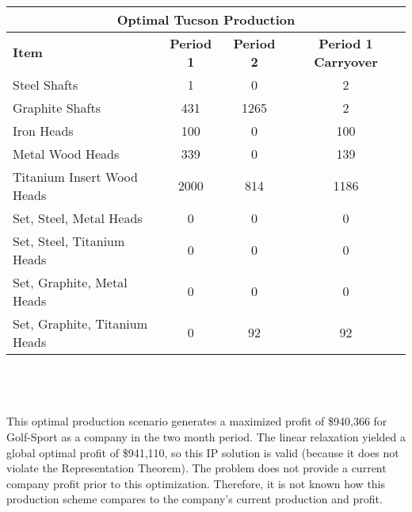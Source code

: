 \documentclass{article}
\begin{document}
\vspace{5mm}
\\
\noindent
\begin{tabular}{ l | c | c | c }
\hline
\multicolumn{4}{|c|}{Optimal Tucson Production} \\
\hline
\textbf{Item} & \textbf{Period 1} & \textbf{Period 2} & \textbf{Period 1 Carryover} \\
Steel Shafts & 1 & 0 & 2 \\
Graphite Shafts & 431 & 1265 & 2 \\
Iron Heads & 100 & 0 & 100 \\
Metal Wood Heads & 339 & 0 & 139 \\
Titanium Insert Wood Heads & 2000 & 814 & 1186 \\
Set, Steel, Metal Heads & 0 & 0 & 0 \\
Set, Steel, Titanium Heads & 0 & 0 & 0 \\
Set, Graphite, Metal Heads & 0 & 0 & 0 \\
Set, Graphite, Titanium Heads & 0 & 92 & 92\\
\end{tabular}
\\
\\
\vspace{5mm}
\\

This optimal production scenario generates a maximized profit of \$940,366 for Golf-Sport as a company in the two month period.  The linear relaxation yielded a global optimal profit of \$941,110, so this 
IP solution is valid (because it does not violate the Representation Theorem).  The problem does not provide a current company profit prior to this optimization.  Therefore, it is not known how this production scheme compares to the company's current production and profit.
\end{document}
